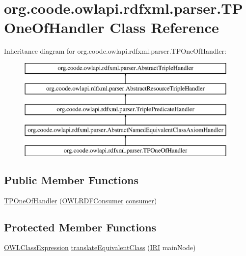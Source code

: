 \hypertarget{classorg_1_1coode_1_1owlapi_1_1rdfxml_1_1parser_1_1_t_p_one_of_handler}{\section{org.\-coode.\-owlapi.\-rdfxml.\-parser.\-T\-P\-One\-Of\-Handler Class Reference}
\label{classorg_1_1coode_1_1owlapi_1_1rdfxml_1_1parser_1_1_t_p_one_of_handler}
}
Inheritance diagram for org.\-coode.\-owlapi.\-rdfxml.\-parser.\-T\-P\-One\-Of\-Handler\-:\begin{figure}[H]
\begin{center}
\leavevmode
\includegraphics[height=5.000000cm]{classorg_1_1coode_1_1owlapi_1_1rdfxml_1_1parser_1_1_t_p_one_of_handler}
\end{center}
\end{figure}
\subsection*{Public Member Functions}
\begin{DoxyCompactItemize}
\item 
\hyperlink{classorg_1_1coode_1_1owlapi_1_1rdfxml_1_1parser_1_1_t_p_one_of_handler_a4e96d2782b16cc01a171b6ceef4515fb}{T\-P\-One\-Of\-Handler} (\hyperlink{classorg_1_1coode_1_1owlapi_1_1rdfxml_1_1parser_1_1_o_w_l_r_d_f_consumer}{O\-W\-L\-R\-D\-F\-Consumer} \hyperlink{classorg_1_1coode_1_1owlapi_1_1rdfxml_1_1parser_1_1_abstract_triple_handler_a4ccf4d898ff01eb1cadfa04b23d54e9c}{consumer})
\end{DoxyCompactItemize}
\subsection*{Protected Member Functions}
\begin{DoxyCompactItemize}
\item 
\hyperlink{interfaceorg_1_1semanticweb_1_1owlapi_1_1model_1_1_o_w_l_class_expression}{O\-W\-L\-Class\-Expression} \hyperlink{classorg_1_1coode_1_1owlapi_1_1rdfxml_1_1parser_1_1_t_p_one_of_handler_aab73093b9e0a6e115419d57184120542}{translate\-Equivalent\-Class} (\hyperlink{classorg_1_1semanticweb_1_1owlapi_1_1model_1_1_i_r_i}{I\-R\-I} main\-Node)
\end{DoxyCompactItemize}


